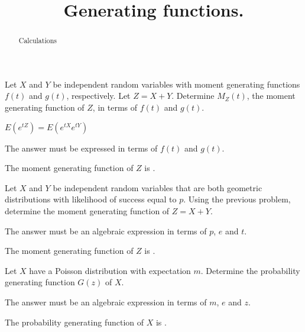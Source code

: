 \documentclass{ximera}
\title{Generating functions.}
\begin{document}
\begin{abstract}
Calculations
\end{abstract}
\maketitle

\begin{question} 
Let $X$ and $Y$ be independent random variables with moment generating functions $f(t)$ and $g(t)$, respectively. Let $Z=X+Y$. Determine $M_{Z}(t)$, the moment generating function of $Z$, in terms of $f(t)$ and $g(t)$.
     \begin{hint}
          $E(e^{tZ}) = E(e^{tX}e^{tY})$
     \end{hint}
     \begin{hint}
          The answer must be expressed in terms of $f(t)$ and $g(t)$.
     \end{hint}
     \begin{solution}
          The moment generating function of $Z$ is .
     \end{solution}
\end{question}

\begin{question}
Let $X$ and $Y$ be independent random variables that are both geometric distributions with likelihood of success equal to $p$. Using the previous problem, determine the moment generating function of $Z=X+Y$.
     \begin{hint}
          The answer must be an algebraic expression in terms of $p$, $e$ and $t$.
     \end{hint}
     \begin{solution}
          The moment generating function of $Z$ is .
     \end{solution}
\end{question}

\begin{question}
Let $X$ have a Poisson distribution with expectation $m$. Determine the probability generating function $G(z)$ of $X$.
     \begin{hint}
          The answer must be an algebraic expression in terms of $m$, $e$ and $z$.
     \end{hint}
     \begin{solution}
          The probability generating function of $X$ is .
     \end{solution}
\end{question}
\end{document}
